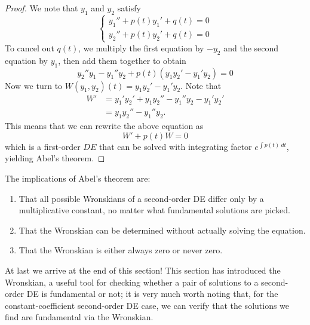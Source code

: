 \documentclass{article}
\begin{document}
\begin{proof}
    We note that $y_1$ and $y_2$ satisfy
    \begin{equation*}
        \begin{cases}
            y_1'' + p(t)y_1' + q(t) = 0 \\
            y_2'' + p(t)y_2' + q(t) = 0
        \end{cases}
    \end{equation*}
    To cancel out $q(t)$, we multiply the first equation by $-y_2$ and the second equation by $y_1$, then add them together to obtain
    \begin{equation*}
        y_2''y_1 - y_1''y_2 + p(t)(y_1y_2' - y_1'y_2) = 0
    \end{equation*}
    Now we turn to $W(y_1, y_2)(t) = y_1 y_2' - y_1' y_2$. Note that 
    \begin{equation*}
        \begin{aligned}
            W' &= y_1'y_2' + y_1y_2'' - y_1''y_2 - y_1'y_2' \\
            &= y_1y_2'' - y_1''y_2.
        \end{aligned}
    \end{equation*}
    This means that we can rewrite the above equation as
    \begin{equation*}
        W' + p(t)W = 0
    \end{equation*}
    which is a first-order $DE$ that can be solved with integrating factor $e^{\int p(t)\ dt}$, yielding Abel's theorem.
\end{proof}
The implications of Abel's theorem are:
\begin{enumerate}
    \item That all possible Wronskians of a second-order DE differ only by a multiplicative constant, no matter what fundamental solutions are picked.
    \item That the Wronskian can be determined without actually solving the equation.
    \item That the Wronskian is either always zero or never zero.
\end{enumerate}
At last we arrive at the end of this section! This section has introduced the Wronskian, a useful tool for checking whether a pair of solutions to a second-order DE is fundamental or not; it is very much worth noting that, for the constant-coefficient second-order DE case, we can verify that the solutions we find are fundamental via the Wronskian.
\end{document}
